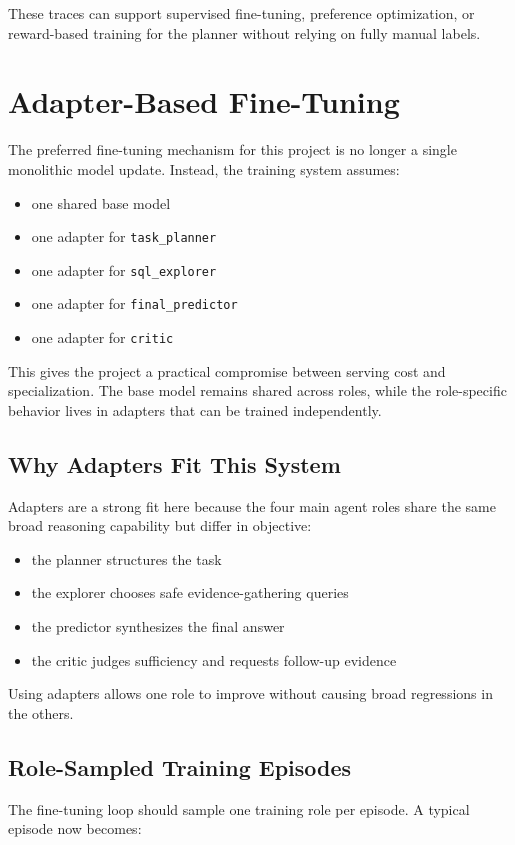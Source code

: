 \documentclass[11pt]{book}
\begin{document}
These traces can support supervised fine-tuning, preference optimization, or reward-based training
for the planner without relying on fully manual labels.

\section{Adapter-Based Fine-Tuning}
The preferred fine-tuning mechanism for this project is no longer a single monolithic model update.
Instead, the training system assumes:

\begin{itemize}
\item one shared base model
\item one adapter for \texttt{task\_planner}
\item one adapter for \texttt{sql\_explorer}
\item one adapter for \texttt{final\_predictor}
\item one adapter for \texttt{critic}
\end{itemize}

This gives the project a practical compromise between serving cost and specialization. The base
model remains shared across roles, while the role-specific behavior lives in adapters that can be
trained independently.

\subsection*{Why Adapters Fit This System}
Adapters are a strong fit here because the four main agent roles share the same broad reasoning
capability but differ in objective:

\begin{itemize}
\item the planner structures the task
\item the explorer chooses safe evidence-gathering queries
\item the predictor synthesizes the final answer
\item the critic judges sufficiency and requests follow-up evidence
\end{itemize}

Using adapters allows one role to improve without causing broad regressions in the others.

\subsection*{Role-Sampled Training Episodes}
The fine-tuning loop should sample one training role per episode. A typical episode now becomes:
\end{document}

